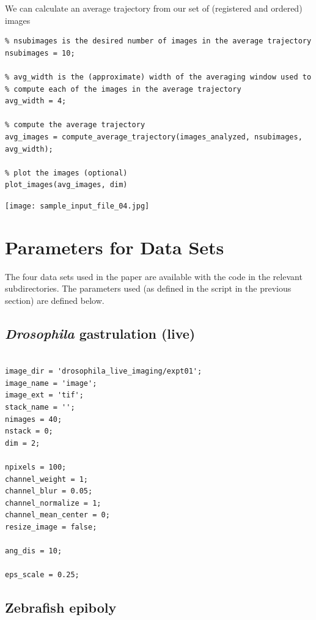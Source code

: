 \documentclass[12pt]{article}
\begin{document}
\begin{par}
We can calculate an average trajectory from our set of (registered and ordered) images
\end{par} \vspace{1em}
\begin{verbatim}
% nsubimages is the desired number of images in the average trajectory
nsubimages = 10;

% avg_width is the (approximate) width of the averaging window used to
% compute each of the images in the average trajectory
avg_width = 4;

% compute the average trajectory
avg_images = compute_average_trajectory(images_analyzed, nsubimages, avg_width);

% plot the images (optional)
plot_images(avg_images, dim)
\end{verbatim}

\texttt{[image: sample\_input\_file\_04.jpg]}

\section{Parameters for Data Sets}

The four data sets used in the paper are available with the code in the relevant subdirectories. The parameters used (as defined in the script in the previous section) are defined below. 

\subsection{{\em Drosophila} gastrulation (live)}

\begin{verbatim}

image_dir = 'drosophila_live_imaging/expt01';
image_name = 'image';
image_ext = 'tif';
stack_name = '';
nimages = 40;
nstack = 0;
dim = 2;

npixels = 100;
channel_weight = 1;
channel_blur = 0.05;
channel_normalize = 1;
channel_mean_center = 0;
resize_image = false;

ang_dis = 10;

eps_scale = 0.25;

\end{verbatim}


\subsection{Zebrafish epiboly}
\end{document}

